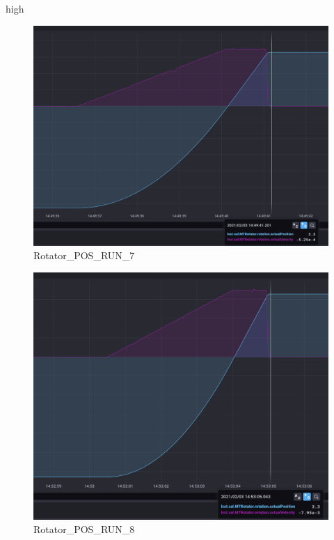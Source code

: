 high\documentclass[SE,lsstdraft,authoryear,toc]{lsstdoc}
\begin{document}
\begin{figure}[h!]
  \includegraphics[width=\linewidth]{media/Rotator_design_speed_pos_test7.png}
  \caption{Rotator\_POS\_RUN\_7}
  \label{fig:Rotator_POS_RUN_7}
\end{figure}
\begin{figure}[h!]
  \includegraphics[width=\linewidth]{media/Rotator_design_speed_pos_test8.png}
  \caption{Rotator\_POS\_RUN\_8}
  \label{fig:Rotator_POS_RUN_8}
\end{figure}
\end{document}
